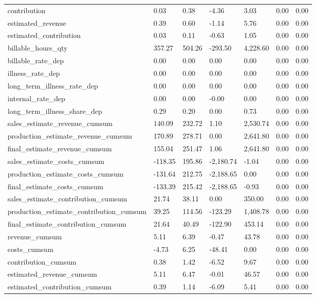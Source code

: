 \begin{landscape}
\begin{longtable}[h!]{lllllll}
contribution & 0.03 & 0.38 & -4.36 & 3.03 & 0.00 & 0.00 \\
estimated_revenue & 0.39 & 0.60 & -1.14 & 5.76 & 0.00 & 0.00 \\
estimated_contribution & 0.03 & 0.11 & -0.63 & 1.05 & 0.00 & 0.00 \\
billable_hours_qty & 357.27 & 504.26 & -293.50 & 4,228.60 & 0.00 & 0.00 \\
billable_rate_dep & 0.00 & 0.00 & 0.00 & 0.00 & 0.00 & 0.00 \\
illness_rate_dep & 0.00 & 0.00 & 0.00 & 0.00 & 0.00 & 0.00 \\
long_term_illness_rate_dep & 0.00 & 0.00 & 0.00 & 0.00 & 0.00 & 0.00 \\
internal_rate_dep & 0.00 & 0.00 & -0.00 & 0.00 & 0.00 & 0.00 \\
long_term_illness_share_dep & 0.29 & 0.20 & 0.00 & 0.73 & 0.00 & 0.00 \\
sales_estimate_revenue_cumsum & 140.09 & 232.72 & 1.10 & 2,530.74 & 0.00 & 0.00 \\
production_estimate_revenue_cumsum & 170.89 & 278.71 & 0.00 & 2,641.80 & 0.00 & 0.00 \\
final_estimate_revenue_cumsum & 155.04 & 251.47 & 1.06 & 2,641.80 & 0.00 & 0.00 \\
sales_estimate_costs_cumsum & -118.35 & 195.86 & -2,180.74 & -1.04 & 0.00 & 0.00 \\
production_estimate_costs_cumsum & -131.64 & 212.75 & -2,188.65 & 0.00 & 0.00 & 0.00 \\
final_estimate_costs_cumsum & -133.39 & 215.42 & -2,188.65 & -0.93 & 0.00 & 0.00 \\
sales_estimate_contribution_cumsum & 21.74 & 38.11 & 0.00 & 350.00 & 0.00 & 0.00 \\
production_estimate_contribution_cumsum & 39.25 & 114.56 & -123.29 & 1,408.78 & 0.00 & 0.00 \\
final_estimate_contribution_cumsum & 21.64 & 40.49 & -122.90 & 453.14 & 0.00 & 0.00 \\
revenue_cumsum & 5.11 & 6.39 & -0.47 & 43.78 & 0.00 & 0.00 \\
costs_cumsum & -4.73 & 6.25 & -48.41 & 0.00 & 0.00 & 0.00 \\
contribution_cumsum & 0.38 & 1.42 & -6.52 & 9.67 & 0.00 & 0.00 \\
estimated_revenue_cumsum & 5.11 & 6.47 & -0.01 & 46.57 & 0.00 & 0.00 \\
estimated_contribution_cumsum & 0.39 & 1.14 & -6.09 & 5.41 & 0.00 & 0.00 \\

\end{longtable}
\end{landscape}
